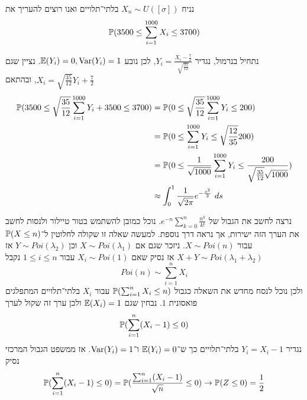 \begin{example}
	נניח $X_n \sim U([\sigma])$ בלתי־תלויים ואנו רוצים להעריך את
	\[
		\mathbb{P}(3500 \le \sum_{i = 1}^{1000} X_i \le 3700)
	\]

	נתחיל בנרמול, נגדיר $Y_i = \frac{X_i - \frac{7}{2}}{\sqrt{\frac{35}{12}}}$, לכן נובע $\mathbb{E}(Y_i) = 0, \operatorname{Var}(Y_i) = 1$.
	נציין שגם $X_i = \sqrt{\frac{35}{12}} Y_i + \frac{7}{2}$, ובהתאם
	\begin{align*}
		\mathbb{P}(3500 \le \sqrt{\frac{35}{12}} \sum_{i = 1}^{1000} Y_i + 3500 \le 3700)
		& = \mathbb{P}(0 \le \sqrt{\frac{35}{12}} \sum_{i = 1}^{1000} Y_i \le 200) \\
		& = \mathbb{P}(0 \le \sum_{i = 1}^{1000} Y_i \le \sqrt{\frac{12}{35}} 200) \\
		& = \mathbb{P}(0 \le \frac{1}{\sqrt{1000}} \sum_{i = 1}^{1000} Y_i \le \frac{200}{\sqrt{\frac{35}{12}} \sqrt{1000}}) \\
		& \approx \int_0^1 \frac{1}{\sqrt{2 \pi}} e^{-\frac{s^2}{2}}\ ds
	\end{align*}
\end{example}
\begin{example}
	נרצה לחשב את הגבול של $e^{-n} \sum_{k = 0}^{n} \frac{n^k}{k!}$.
	נוכל כמובן להשתמש בטור טיילור ולנסות לחשב את הערך הזה ישירות, אך נראה דרך נוספת.
	למעשה שאלה זו שקולה לחלוטין ל־$\mathbb{P}(X \le n)$ עבור $X \sim Poi(n)$.
	ניזכר שגם אם $X \sim Poi(\lambda_1)$ וכן $Y \sim Poi(\lambda_2)$ אז $X + Y \sim Poi(\lambda_1 + \lambda_2)$ אז נסיק שאם $X_i \sim Poi(1)$ עבור $1 \le i \le n$ נקבל
	\[
		Poi(n) \sim \sum_{i = 1}^{n} X_i
	\]
	ולכן נוכל לנסח מחדש את השאלה כגבול $\mathbb{P}(\sum_{i = 1}^{n} X_i \le n)$ עבור $X_i$ בלתי־תלויים המתפלגים פואסונית $1$.
	נבחין שגם $\mathbb{E}(X_i) = 1$ ולכן ערך זה שקול לערך
	\[
		\mathbb{P}(\sum_{i = 1}^{n} (X_i - 1) \le 0)
	\]
	נגדיר $Y_i = X_i - 1$ בלתי־תלויים כך ש־$\mathbb{E}(Y_i) = 0$ ו־$\operatorname{Var}(Y_i) = 1$.
	אז ממשפט הגבול המרכזי נסיק
	\[
		\mathbb{P}(\sum_{i = 1}^{n} (X_i - 1) \le 0)
		= \mathbb{P}(\frac{\sum_{i = 1}^{n} (X_i - 1)}{\sqrt{n}} \le 0)
		\to \mathbb{P}(Z \le 0)
		= \frac{1}{2}
	\]
\end{example}

